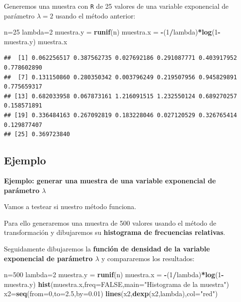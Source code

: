 \documentclass[]{book}
\newenvironment{Shaded}{\begin{snugshade}}{\end{snugshade}}
\newcommand{\DataTypeTok}[1]{\textcolor[rgb]{0.13,0.29,0.53}{#1}}
\newcommand{\DecValTok}[1]{\textcolor[rgb]{0.00,0.00,0.81}{#1}}
\newcommand{\FloatTok}[1]{\textcolor[rgb]{0.00,0.00,0.81}{#1}}
\newcommand{\KeywordTok}[1]{\textcolor[rgb]{0.13,0.29,0.53}{\textbf{#1}}}
\newcommand{\NormalTok}[1]{#1}
\newcommand{\OperatorTok}[1]{\textcolor[rgb]{0.81,0.36,0.00}{\textbf{#1}}}
\newcommand{\OtherTok}[1]{\textcolor[rgb]{0.56,0.35,0.01}{#1}}
\newcommand{\StringTok}[1]{\textcolor[rgb]{0.31,0.60,0.02}{#1}}
\begin{document}
Generemos una muestra con \texttt{R} de 25 valores de una variable exponencial de parámetro \(\lambda=2\) usando el método anterior:

\begin{Shaded}
\begin{Highlighting}[]
\NormalTok{n=}\DecValTok{25}
\NormalTok{lambda=}\DecValTok{2}
\NormalTok{muestra.y =}\StringTok{ }\KeywordTok{runif}\NormalTok{(n)}
\NormalTok{muestra.x =}\StringTok{ }\OperatorTok{-}\NormalTok{(}\DecValTok{1}\OperatorTok{/}\NormalTok{lambda)}\OperatorTok{*}\KeywordTok{log}\NormalTok{(}\DecValTok{1}\OperatorTok{-}\NormalTok{muestra.y)}
\NormalTok{muestra.x}
\end{Highlighting}
\end{Shaded}

\begin{verbatim}
##  [1] 0.062256517 0.387562735 0.027692186 0.291087771 0.403917952 0.778602890
##  [7] 0.131150860 0.280350342 0.003796249 0.219507956 0.945829891 0.775659317
## [13] 0.682033958 0.067873161 1.216091515 1.232550124 0.689270257 0.158571891
## [19] 0.336484163 0.267092819 0.183228046 0.027120529 0.326765414 0.129877407
## [25] 0.369723840
\end{verbatim}

\hypertarget{ejemplo-30}{%
\subsection{Ejemplo}\label{ejemplo-30}}

\textbf{Ejemplo: generar una muestra de una variable exponencial de parámetro \(\lambda\)}

Vamos a testear si nuestro método funciona.

Para ello generaremos una muestra de 500 valores usando el método de transformación y dibujaremos su \textbf{histograma de frecuencias relativas}.

Seguidamente dibujaremos la \textbf{función de densidad de la variable exponencial de parámetro \(\lambda\)} y compararemos los resultados:

\begin{Shaded}
\begin{Highlighting}[]
\NormalTok{n=}\DecValTok{500}
\NormalTok{lambda=}\DecValTok{2}
\NormalTok{muestra.y =}\StringTok{ }\KeywordTok{runif}\NormalTok{(n)}
\NormalTok{muestra.x =}\StringTok{ }\OperatorTok{-}\NormalTok{(}\DecValTok{1}\OperatorTok{/}\NormalTok{lambda)}\OperatorTok{*}\KeywordTok{log}\NormalTok{(}\DecValTok{1}\OperatorTok{-}\NormalTok{muestra.y)}
\KeywordTok{hist}\NormalTok{(muestra.x,}\DataTypeTok{freq=}\OtherTok{FALSE}\NormalTok{,}\DataTypeTok{main=}\StringTok{"Histograma de la muestra"}\NormalTok{)}
\NormalTok{x2=}\KeywordTok{seq}\NormalTok{(}\DataTypeTok{from=}\DecValTok{0}\NormalTok{,}\DataTypeTok{to=}\FloatTok{2.5}\NormalTok{,}\DataTypeTok{by=}\FloatTok{0.01}\NormalTok{)}
\KeywordTok{lines}\NormalTok{(x2,}\KeywordTok{dexp}\NormalTok{(x2,lambda),}\DataTypeTok{col=}\StringTok{"red"}\NormalTok{)}
\end{Highlighting}
\end{Shaded}
\end{document}
